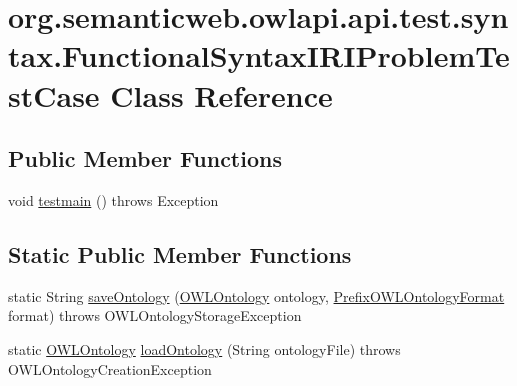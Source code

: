 \hypertarget{classorg_1_1semanticweb_1_1owlapi_1_1api_1_1test_1_1syntax_1_1_functional_syntax_i_r_i_problem_test_case}{\section{org.\-semanticweb.\-owlapi.\-api.\-test.\-syntax.\-Functional\-Syntax\-I\-R\-I\-Problem\-Test\-Case Class Reference}
\label{classorg_1_1semanticweb_1_1owlapi_1_1api_1_1test_1_1syntax_1_1_functional_syntax_i_r_i_problem_test_case}
}
\subsection*{Public Member Functions}
\begin{DoxyCompactItemize}
\item 
void \hyperlink{classorg_1_1semanticweb_1_1owlapi_1_1api_1_1test_1_1syntax_1_1_functional_syntax_i_r_i_problem_test_case_a624e179d8a36dc80bfef0f6695cf6574}{testmain} ()  throws Exception 
\end{DoxyCompactItemize}
\subsection*{Static Public Member Functions}
\begin{DoxyCompactItemize}
\item 
static String \hyperlink{classorg_1_1semanticweb_1_1owlapi_1_1api_1_1test_1_1syntax_1_1_functional_syntax_i_r_i_problem_test_case_a257bb74c6b1e5bc79f20a4b87fb337f8}{save\-Ontology} (\hyperlink{interfaceorg_1_1semanticweb_1_1owlapi_1_1model_1_1_o_w_l_ontology}{O\-W\-L\-Ontology} ontology, \hyperlink{classorg_1_1semanticweb_1_1owlapi_1_1vocab_1_1_prefix_o_w_l_ontology_format}{Prefix\-O\-W\-L\-Ontology\-Format} format)  throws O\-W\-L\-Ontology\-Storage\-Exception 
\item 
static \hyperlink{interfaceorg_1_1semanticweb_1_1owlapi_1_1model_1_1_o_w_l_ontology}{O\-W\-L\-Ontology} \hyperlink{classorg_1_1semanticweb_1_1owlapi_1_1api_1_1test_1_1syntax_1_1_functional_syntax_i_r_i_problem_test_case_a224975de429db2d507cf61b592c14f65}{load\-Ontology} (String ontology\-File)  throws O\-W\-L\-Ontology\-Creation\-Exception 
\end{DoxyCompactItemize}



